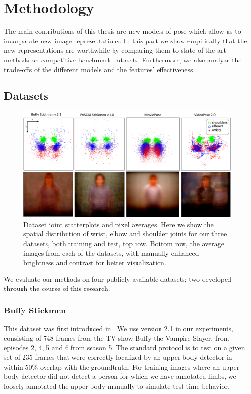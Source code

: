 \chapter{Methodology}
The main contributions of this thesis are new models of pose which allow us to 
incorporate new image representations.  In this part we show empirically that the new 
representations are worthwhile by comparing them to state-of-the-art methods on 
competitive benchmark datasets.  Furthermore, we also analyze the trade-offs of 
the different models and the features' effectiveness.

\section{Datasets}\label{sec:datasets}
\begin{figure}[tb!]
\begin{center}
\includegraphics[width=1.05\textwidth]{figs/dataset-scatterplots.pdf}
\caption[Dataset joint scatterplots and pixel averages.]{Dataset joint 
scatterplots and pixel averages.  Here we show the spatial distribution of 
wrist, elbow and shoulder joints for our three datasets, both training and 
test, top row.  Bottom row, the average images from each of the datasets, with 
manually enhanced brightness and contrast for better visualization.}
\label{fig:dataset-scatterplots}
\end{center}
\end{figure}



We evaluate our methods on four publicly available datasets; two developed through the course of this research.

\subsection{Buffy Stickmen}
This dataset was first introduced in \citet{ferrari08}.  We use version 2.1 in 
our experiments, consisting of 748 frames from the TV show Buffy the Vampire 
Slayer, from episodes 2, 4, 5 and 6 from season 5.  The standard protocol is to 
test on a given set of 235 frames that were correctly localized by an upper 
body detector in~\citet{ferrari08}---within 50\% overlap with the groundtruth.  
For training images where an upper body detector did not detect a person for 
which we have annotated limbs, we loosely annotated the upper body manually to 
simulate test time behavior.
  

